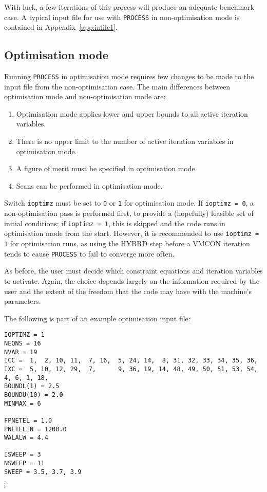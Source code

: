 \documentclass[11pt,a4paper]{report}
\newcommand{\process}{\mbox{\texttt{PROCESS}}}
\begin{document}
With luck, a few iterations of this process will produce an adequate benchmark
case. A typical input file for use with \process\/ in non-optimisation mode is
contained in Appendix~\ref{app:infile1}.

\subsection{Optimisation mode}
\label{sec:optim}

Running \process\/ in optimisation mode requires few changes to be made to the
input file from the non-optimisation case. The main differences between
optimisation mode and non-optimisation mode are:

\begin{enumerate}

\item Optimisation mode applies lower and upper bounds to all active iteration
  variables.

\item There is no upper limit to the number of active iteration variables in
  optimisation mode.

\item A figure of merit must be specified in optimisation mode.

\item Scans can be performed in optimisation mode.

\end{enumerate}

Switch \texttt{ioptimz} must be set to \texttt{0} or \texttt{1} for
optimisation mode. If \texttt{ioptimz = 0}, a non-optimisation pass is
performed first, to provide a (hopefully) feasible set of initial conditions;
if \texttt{ioptimz = 1}, this is skipped and the code runs in optimisation
mode from the start. However, it is recommended to use \texttt{ioptimz = 1}
for optimisation runs, as using the HYBRD step before a VMCON iteration tends
to cause \process\/ to fail to converge more often.

As before, the user must decide which constraint equations and iteration
variables to activate. Again, the choice depends largely on the information
required by the user and the extent of the freedom that the code may have with
the machine's parameters.

The following is part of an example optimisation input file:
\begin{verbatim}
IOPTIMZ = 1
NEQNS = 16
NVAR = 19
ICC =  1,  2, 10, 11,  7, 16,  5, 24, 14,  8, 31, 32, 33, 34, 35, 36,
IXC =  5, 10, 12, 29,  7,      9, 36, 19, 14, 48, 49, 50, 51, 53, 54,
4, 6, 1, 18,
BOUNDL(1) = 2.5
BOUNDU(10) = 2.0
MINMAX = 6

FPNETEL = 1.0
PNETELIN = 1200.0
WALALW = 4.4

ISWEEP = 3
NSWEEP = 11
SWEEP = 3.5, 3.7, 3.9
\end{verbatim}
\vspace{-6mm}
$\vdots$
\end{document}
